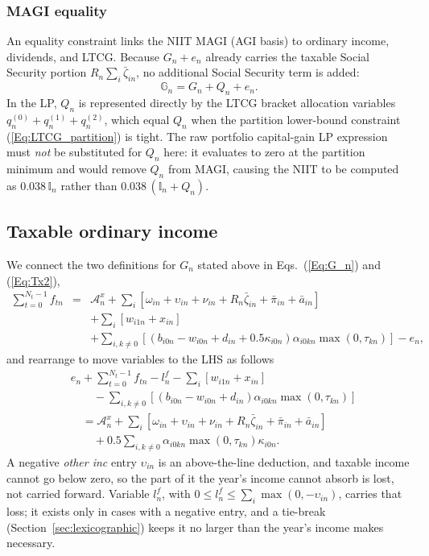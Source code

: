 \documentclass[fleqn,12pt]{report}
\begin{document}
	\subsubsection*{MAGI equality}
	An equality constraint links the NIIT MAGI (AGI basis) to ordinary income,
	dividends, and LTCG. Because $G_n + e_n$ already carries the taxable Social
	Security portion $R_n\sum_i\bar\zeta_{in}$, no additional Social Security term
	is added:
	\begin{equation}
		\mathbb{G}_n = G_n + Q_n + e_n.
		\label{Eq:MAGI}
	\end{equation}
	In the LP, $Q_n$ is represented directly by the LTCG bracket allocation
	variables $q^{(0)}_n + q^{(1)}_n + q^{(2)}_n$, which equal $Q_n$ when the
	partition lower-bound constraint (\ref{Eq:LTCG_partition}) is tight.
	The raw portfolio capital-gain LP expression must \emph{not} be substituted
	for $Q_n$ here: it evaluates to zero at the partition minimum and would
	remove $Q_n$ from MAGI, causing the NIIT to be computed as
	$0.038\,\mathbb{I}_n$ rather than $0.038\,(\mathbb{I}_n + Q_n)$.

\subsection{Taxable ordinary income}
	We connect the two definitions for $G_n$ stated above in Eqs.~(\ref{Eq:G_n}) and (\ref{Eq:Tx2}),
	\begin{eqnarray}
		\sum_{t=0}^{N_t-1} f_{tn} &=& \mathcal{A}^x_n +
		\sum_i [\omega_{in} + \upsilon_{in} + \nu_{in} + R_n\bar\zeta_{in} + \bar{\pi}_{in} + \bar{a}_{in}]  \nonumber \\
		&& + \sum_i [w_{i1n} + x_{in} ]
		\nonumber\\
		&& + \sum_{i,k\neq 0} [(b_{i0n} - w_{i0n} + d_{in}
		     + 0.5\kappa_{i0n})\alpha_{i0kn}\max(0, \tau_{kn})] - e_n,
	\end{eqnarray}
	and rearrange to move variables to the LHS as follows
	\begin{equation}
		\label{Eq:C6}
		\begin{aligned}
		&e_n + \sum_{t=0}^{N_t-1} f_{tn} - l^{f}_n - \sum_i [ w_{i1n} + x_{in}] \\
		&\qquad - \sum_{i,k\neq 0} [(b_{i0n} - w_{i0n} + d_{in})\alpha_{i0kn}\max(0, \tau_{kn})] \\
		&\quad= \mathcal{A}^x_n
		+ \sum_i [\omega_{in} + \upsilon_{in} + \nu_{in} + R_n\bar\zeta_{in} + \bar{\pi}_{in} + \bar{a}_{in}] \\
		&\qquad + 0.5\sum_{i,k\neq 0} \alpha_{i0kn}\max(0, \tau_{kn})\kappa_{i0n}.
		\end{aligned}
	\end{equation}
	A negative \textit{other inc} entry $\upsilon_{in}$ is an above-the-line deduction, and taxable
	income cannot go below zero, so the part of it the year's income cannot absorb is lost, not
	carried forward.  Variable $l^{f}_n$, with $0 \le l^{f}_n \le \sum_i \max(0, -\upsilon_{in})$,
	carries that loss; it exists only in cases with a negative entry, and a tie-break
	(Section~\ref{sec:lexicographic}) keeps it no larger than the year's income makes necessary.
\end{document}
